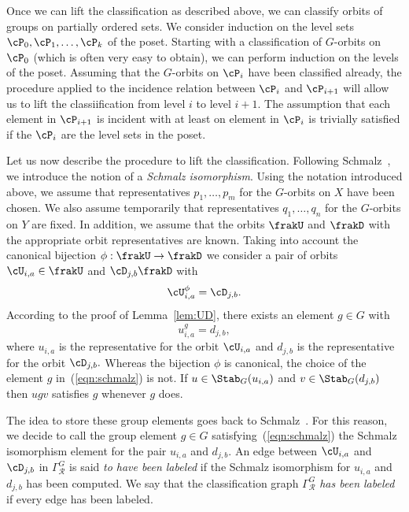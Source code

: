 Once we can lift the classification as described above, 
we can classify orbits of groups on partially ordered sets.
We consider induction on the level sets
$\cP_0, \cP_1, \ldots, \cP_k$ of the poset. 
Starting with a classification of $G$-orbits on $\cP_0$ (which is often very easy to obtain), 
we can perform induction on the levels of the poset.
Assuming that the $G$-orbits on $\cP_i$ have been classified already, 
the procedure applied to the incidence relation 
between $\cP_i$ and $\cP_{i+1}$ will allow us to lift the classiification from level $i$ to level $i+1.$ 
The assumption that each element in $\cP_{i+1}$ is incident with at least on element in $\cP_i$ 
is trivially satisfied if the $\cP_i$ are the level sets in the poset. 

  

\bigskip

Let us now describe the procedure to lift the classification.
Following Schmalz~\cite{Schmalz90}, we introduce the notion of a {\em Schmalz isomorphism}.
Using the notation introduced above, we assume that 
representatives $p_1,\ldots, p_m$ for the $G$-orbits on $X$ have been chosen.
We also assume temporarily that representatives $q_1,\ldots, q_n$ for the $G$-orbits on $Y$ are fixed.
In addition, we assume that the orbits $\frakU$ and $\frakD$ with the appropriate orbit representatives 
are known. Taking into account the canonical bijection $\phi: \frakU \rightarrow \frakD$
we consider a pair 
of orbits $\cU_{i,a} \in \frakU$ and $\cD_{j,b}\frakD$ with 
\begin{equation}\label{eqn:phi}
\cU_{i,a}^\phi = \cD_{j,b}.
\end{equation}
According to the proof of Lemma~\ref{lem:UD}, 
there exists an element $g \in G$ with 
\begin{equation}\label{eqn:schmalz}
u_{i,a}^g = d_{j,b},
\end{equation}
where $u_{i,a}$ is the representative for the orbit $\cU_{i,a}$ and 
$d_{j,b}$ is the representative for the orbit $\cD_{j,b}.$  
Whereas the bijection $\phi$ is canonical, the choice 
of the element  $g$ in~(\ref{eqn:schmalz}) is not. 
If $u \in \Stab_{G}(u_{i,a})$ and $v \in \Stab_G(d_{j,b})$ 
then $ugv$ satisfies $g$ whenever $g$ does.


\bigskip



The idea to store these group elements goes back to Schmalz~\cite{Schmalz90}.
For this reason, we decide to call the group element $g \in G$ satisfying~(\ref{eqn:schmalz}) 
the Schmalz isomorphism element for the pair $u_{i,a}$ and $d_{j,b}.$ 
An edge between $\cU_{i,a}$ and $\cD_{j,b}$ 
in $\Gamma_{\mathcal R}^G$ is said {\em to have been labeled} 
if the Schmalz isomorphism 
for $u_{i,a}$ and $d_{j,b}$ has been computed.
We say that the classification graph $\Gamma_{\mathcal R}^G$ {\em has been labeled}
if every edge has been labeled. 




